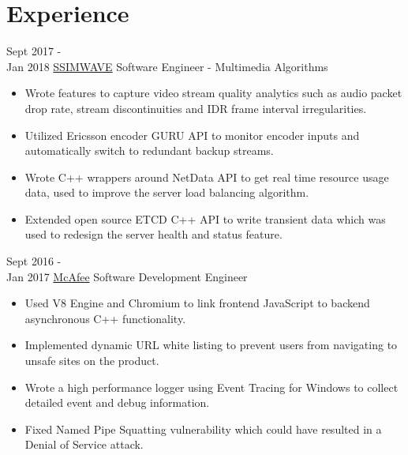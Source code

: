 \documentclass[letterpaper]{twentysecondcv} %
\begin{document}
\makeprofile %



\section{Experience}

\begin{twenty} %
		\twentyitem
    	{Sept 2017 -\\Jan 2018}
        {\href{https://www.ssimwave.com}{SSIMWAVE}}
        {Software Engineer - Multimedia Algorithms}
        {}
        {
        {\begin{itemize}
        \item Wrote features to capture video stream quality analytics such as audio packet drop rate, stream discontinuities and IDR frame interval irregularities.
        \item Utilized Ericsson encoder GURU API to monitor encoder inputs and automatically switch to redundant backup streams.
        \item Wrote C++ wrappers around NetData API to get real time resource usage data, used to improve the server load balancing algorithm.
        \item Extended open source ETCD C++ API to write transient data which was used to redesign the server health and status feature.
    \end{itemize}}
        }

	\twentyitem
    	{Sept 2016 - \\Jan 2017}
        {\href{https://www.mcafee.com/ca/index.html}{McAfee}}
        {Software Development Engineer}
        {}
        {
        {\begin{itemize}
        \item Used V8 Engine and Chromium to link frontend JavaScript to backend asynchronous C++ functionality.
        \item Implemented dynamic URL white listing to prevent users from navigating to unsafe sites on the product.
        \item Wrote a high performance logger using Event Tracing for Windows to collect detailed event and debug information.
        \item Fixed Named Pipe Squatting vulnerability which could have resulted in a Denial of Service attack.
    \end{itemize}}
        }
        

\end{twenty}
\end{document}
